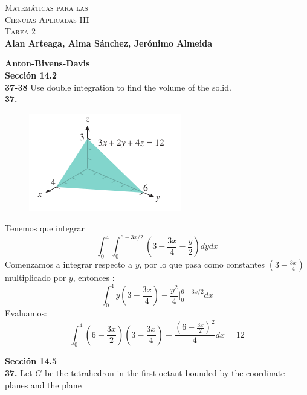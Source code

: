 \documentclass[11pt]{report}
\begin{document}
\newcommand{\BP}[1]{\bigg( #1 \bigg)} %
\newcommand{\Bp}[1]{\Big( #1 \Big)} %
\newcommand{\bp}[1]{\big( #1 \big)} %

\newcommand{\tsint}[1]{\int_0^{#1}} %

\begin{center}
		\textsc{\huge Matemáticas para las \\Ciencias Aplicadas III \\ Tarea 2\\}
		\textbf{Alan Arteaga, Alma Sánchez, Jerónimo Almeida}
\end{center}

\textbf{Anton-Bivens-Davis} \\

\textbf{Sección 14.2} \\

\textbf{37-38} Use double integration to find the volume of the solid. \\

\textbf{37.} \\

\begin{figure}[h]
\includegraphics[scale=0.5]{img1.png}
\centering
\end{figure}

Tenemos que integrar
\[\int_0^4 \int_0^{6-3x/2}\left( 3- \frac{3x}{4}- \frac{y}{2} \right) dy dx\]
Comenzamos a integrar respecto a $y$, por lo que pasa como constantes $(3- \frac{3x}{4})$ multiplicado por $y$, entonces :
\[\int_0^4 y \left( 3- \frac{3x}{4}\right)- \frac{y^2}{4} \vert_0^{6-3x/2} dx\]
Evaluamos:
\[\int_0^4 \left(6 - \frac{3x}{2} \right)\left( 3- \frac{3x}{4}\right)- \frac{\left(6 - \frac{3x}{2} \right)^2}{4} dx = 12\]

\textbf{Sección 14.5} \\

\textbf{37.} Let $G$ be the tetrahedron in the first octant bounded by the
coordinate planes and the plane \\
\end{document}
